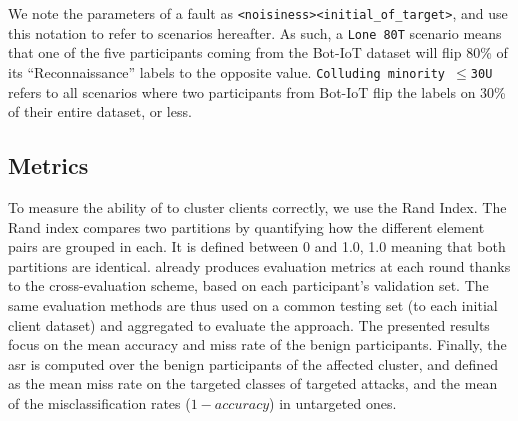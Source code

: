 We note the parameters of a fault as \verb|<noisiness><initial_of_target>|, and use this notation to refer to scenarios hereafter.
As  such, a \texttt{Lone 80T} scenario means that one of the five participants coming from the Bot-IoT dataset will flip 80\% of its ``Reconnaissance'' labels to the opposite value.
\texttt{Colluding minority $\leq$30U} refers to all scenarios where two participants from Bot-IoT flip the labels on 30\% of their entire dataset, or less.


\subsection{Metrics\label{sec:eval.methodo.metrics}}

To measure the ability of \thecontrib to cluster clients correctly, we use the Rand Index. 
The Rand index compares two partitions by quantifying how the different element pairs are grouped in each.
It is defined between 0 and 1.0, 1.0 meaning that both partitions are identical.
\thecontrib already produces evaluation metrics at each round thanks to the cross-evaluation scheme, based on each participant's validation set.
The same evaluation methods are thus used on a common testing set (to each initial client dataset) and aggregated to evaluate the approach.
The presented results focus on the mean accuracy and miss rate of the benign participants.
Finally, the \gls{asr} is computed over the benign participants of the affected cluster, and defined as the mean miss rate on the targeted classes of targeted attacks, and the mean of the misclassification rates (\ie $1-accuracy$) in untargeted ones.
